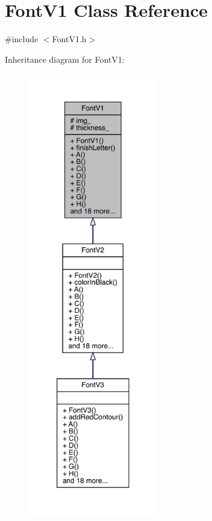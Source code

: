 \hypertarget{class_font_v1}{}\section{Font\+V1 Class Reference}
\label{class_font_v1}


{\ttfamily \#include $<$Font\+V1.\+h$>$}



Inheritance diagram for Font\+V1\+:\nopagebreak
\begin{figure}[H]
\begin{center}
\leavevmode
\includegraphics[height=550pt]{class_font_v1__inherit__graph}
\end{center}
\end{figure}



